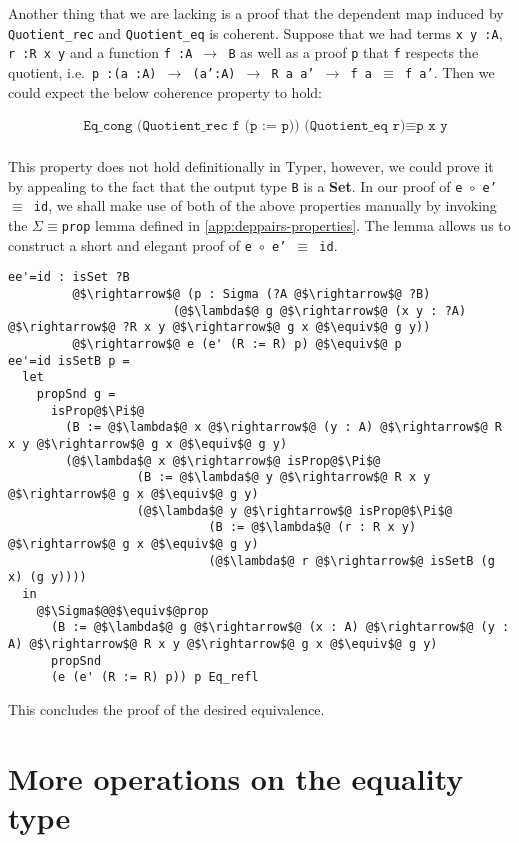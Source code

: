 \documentclass[12pt,twoside,maitrise]{dms}
\theoremstyle{definition}
\numberwithin{equation}{section}
\numberwithin{table}{chapter}
\numberwithin{figure}{chapter}
\newcommand\id[1] {\texttt{#1}}
\newcommand\fn[1] {\texttt{#1}}
\begin{document}
Another thing that we are lacking is a proof that the dependent map induced by
\id{Quotient\_rec} and \id{Quotient\_eq} is coherent. Suppose that we had terms
\fn{x y :\@ A}, \fn{r :\@ R x y} and a function \fn{f :\@ A $\rightarrow$ B} as well as a
proof \id{p} that \id{f} respects the quotient, i.e.\ \fn{p :\@ (a :\@ A) $\rightarrow$
  (a':A) $\rightarrow$ R a a' $\rightarrow$ f a $\equiv$ f a'}. Then we could
expect the below coherence property to hold:

\begin{align*}
  & \fn{Eq\_cong (Quotient\_rec f (p := p)) (Quotient\_eq r)} \equiv \fn{p x y} \\
\end{align*}

This property does not hold definitionally in Typer, however, we could prove it
by appealing to the fact that the output type \id{B} is a \textbf{Set}. In our
proof of \fn{e $\circ{}$ e' $\equiv$ id}, we shall make use of both of the above
properties manually by invoking the \id{$\Sigma$$\equiv$prop} lemma defined in
\autoref{app:deppairs-properties}. The lemma allows us to construct a short and
elegant proof of \fn{e $\circ{}$ e' $\equiv$ id}.

\begin{verbatim}
ee'=id : isSet ?B
         @$\rightarrow$@ (p : Sigma (?A @$\rightarrow$@ ?B)
                       (@$\lambda$@ g @$\rightarrow$@ (x y : ?A) @$\rightarrow$@ ?R x y @$\rightarrow$@ g x @$\equiv$@ g y))
         @$\rightarrow$@ e (e' (R := R) p) @$\equiv$@ p
ee'=id isSetB p =
  let
    propSnd g =
      isProp@$\Pi$@
        (B := @$\lambda$@ x @$\rightarrow$@ (y : A) @$\rightarrow$@ R x y @$\rightarrow$@ g x @$\equiv$@ g y)
        (@$\lambda$@ x @$\rightarrow$@ isProp@$\Pi$@
                  (B := @$\lambda$@ y @$\rightarrow$@ R x y @$\rightarrow$@ g x @$\equiv$@ g y)
                  (@$\lambda$@ y @$\rightarrow$@ isProp@$\Pi$@
                            (B := @$\lambda$@ (r : R x y) @$\rightarrow$@ g x @$\equiv$@ g y)
                            (@$\lambda$@ r @$\rightarrow$@ isSetB (g x) (g y))))
  in
    @$\Sigma$@@$\equiv$@prop
      (B := @$\lambda$@ g @$\rightarrow$@ (x : A) @$\rightarrow$@ (y : A) @$\rightarrow$@ R x y @$\rightarrow$@ g x @$\equiv$@ g y)
      propSnd
      (e (e' (R := R) p)) p Eq_refl
\end{verbatim}

This concludes the proof of the desired equivalence.

\chapter{More operations on the equality type}\label{app:more-eq-ops}
\end{document}
